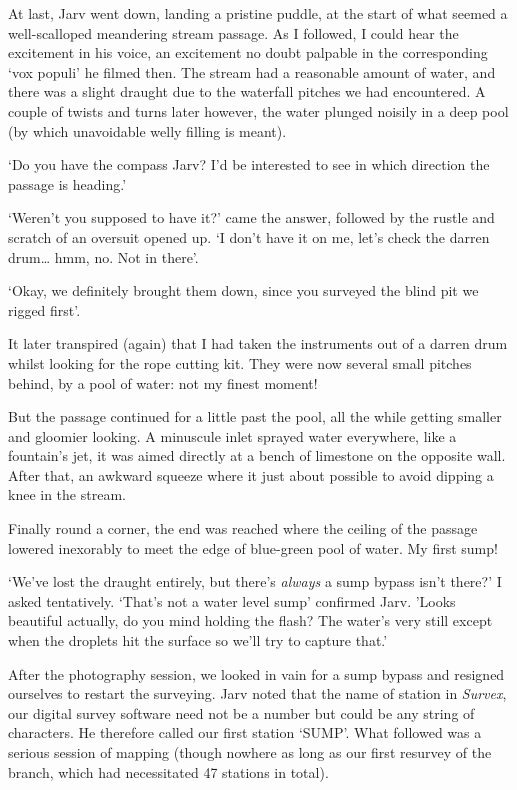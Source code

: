 At last, Jarv went down, landing a pristine puddle, at the start of what seemed a well-scalloped meandering stream passage. As I followed, I could hear the excitement in his voice, an excitement no doubt palpable in the corresponding `vox populi' he filmed then. The stream had a reasonable amount of water, and there was a slight draught due to the waterfall pitches we had encountered. A couple of twists and turns later however, the water plunged noisily in a deep pool (by which unavoidable welly filling is meant). 

`Do you have the compass Jarv? I'd be interested to see in which direction the passage is heading.'

`Weren't you supposed to have it?' came the answer, followed by the rustle and scratch of an oversuit opened up. `I don't have it on me, let's check the darren drum… hmm, no. Not in there'.

`Okay, we definitely brought them down, since you surveyed the blind pit we rigged first'.

It later transpired (again) that I had taken the instruments out of a darren drum whilst looking for the rope cutting kit.  They were now several small pitches behind, by a pool of water: not my finest moment! 

But the passage continued for a little past the pool, all the while getting smaller and gloomier looking. A minuscule inlet sprayed water everywhere, like a fountain's jet, it was aimed directly at a bench of limestone on the opposite wall. After that, an awkward squeeze where it just about possible to avoid dipping a knee in the stream. 

Finally round a corner, the end was reached where the ceiling of the passage lowered inexorably to meet the edge of blue-green pool of water. My first sump!

`We've lost the draught entirely, but there's \emph{always} a sump bypass isn't there?' I asked tentatively.
`That's not a water level sump' confirmed Jarv. 'Looks beautiful actually, do you mind holding the flash? The water's very still except when the droplets hit the surface so we'll try to capture that.'

After the photography session, we looked in vain for a sump bypass and resigned ourselves to restart the surveying. Jarv noted that the name of station in \emph{Survex}, our digital survey software need not be a number but could be any string of characters. He therefore called our first station `SUMP'. What followed was a serious session of mapping (though nowhere as long as our first resurvey of the  branch, which had necessitated 47 stations in total). 

